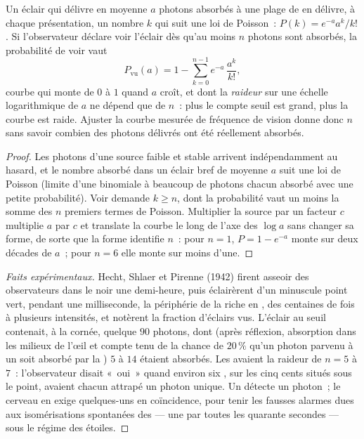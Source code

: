 \begin{theorem}\label{thm:b3:sensory-systems:hecht}
Un éclair qui délivre en moyenne $a$ photons absorbés à une plage de
 en délivre, à chaque présentation, un nombre $k$ qui suit une
loi de Poisson~: $P(k) = e^{-a}a^{k}/k!$. Si l'observateur déclare voir
l'éclair dès qu'au moins $n$ photons sont absorbés, la probabilité de
voir vaut
\[
P_{\text{vu}}(a) = 1 - \sum_{k=0}^{n-1} e^{-a}\,\frac{a^{k}}{k!} ,
\]
courbe qui monte de $0$ à $1$ quand $a$ croît, et dont la
\emph{raideur} sur une échelle logarithmique de $a$ ne dépend que de
$n$~: plus le compte seuil est grand, plus la courbe est raide. Ajuster
la courbe mesurée de fréquence de vision donne donc $n$ sans savoir
combien des photons délivrés ont été réellement absorbés.
\end{theorem}
\begin{proof}
Les photons d'une source faible et stable arrivent indépendamment au
hasard, et le nombre absorbé dans un éclair bref de moyenne $a$ suit une
loi de Poisson (limite d'une binomiale à beaucoup de photons chacun
absorbé avec une petite probabilité). Voir demande $k \ge n$, dont la
probabilité vaut un moins la somme des $n$ premiers termes de Poisson.
Multiplier la source par un facteur $c$ multiplie $a$ par $c$ et
translate la courbe le long de l'axe des $\log a$ sans changer sa forme,
de sorte que la forme identifie $n$~: pour $n =
1$, $P = 1 - e^{-a}$ monte sur deux décades de $a$~; pour $n = 6$ elle
monte sur moins d'une.
\end{proof}

\begin{proof}[Faits expérimentaux]
Hecht, Shlaer et Pirenne (1942) firent asseoir des observateurs dans le
noir une demi-heure, puis éclairèrent d'un minuscule point vert, pendant
une milliseconde, la périphérie de la  riche en , des
centaines de fois à plusieurs intensités, et notèrent la fraction
d'éclairs vus. L'éclair au seuil contenait, à la cornée, quelque $90$
photons, dont (après réflexion, absorption dans les milieux de l'œil et
compte tenu de la chance de $20\,\%$ qu'un photon parvenu à un 
soit absorbé par la ) $5$ à $14$ étaient absorbés. Les  avaient la raideur de
$n = 5$ à $7$~: l'observateur disait «~oui~» quand environ six
, sur les cinq cents situés sous le point, avaient chacun
attrapé un photon unique. Un  détecte un photon~; le cerveau en
exige quelques-uns en coïncidence, pour tenir les fausses alarmes dues
aux isomérisations spontanées des  --- une par  toutes
les quarante secondes --- sous le régime des étoiles.
\end{proof}

